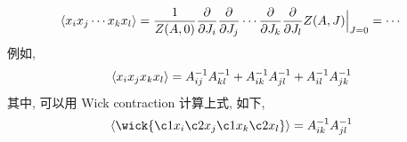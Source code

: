 \begin{itemize}
	\begin{tcolorbox}[title=calculation:]
		\begin{equation}
			\braket{x_i x_j \cdots x_k x_l} = \frac{1}{Z(A, 0)} \frac{\partial}{\partial J_i} \frac{\partial}{\partial J_j} \cdots \frac{\partial}{\partial J_k} \frac{\partial}{\partial J_l} Z(A, J) \Big|_{J = 0} = \cdots
		\end{equation}
		例如,
		\begin{equation}
			\braket{x_i x_j x_k x_l} = A^{- 1}_{i j} A^{- 1}_{k l} + A^{- 1}_{i k} A^{- 1}_{j l} + A^{- 1}_{i l} A^{- 1}_{j k}
		\end{equation}
		其中, 可以用 Wick contraction 计算上式, 如下,
		\begin{equation}
			\braket{\wick{
				\c1 x_i \c2 x_j \c1 x_k \c2 x_l
			}} = A^{- 1}_{i k} A^{- 1}_{j l}
		\end{equation}
	\end{tcolorbox}
\end{itemize}

